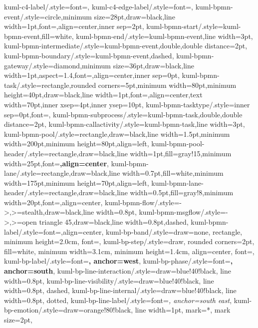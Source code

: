 {    kuml-c4-label/.style={font=\sffamily},
    kuml-c4-edge-label/.style={font=\sffamily\small},
    kuml-bpmn-event/.style={circle,minimum size=28pt,draw=black,line width=1pt,font=\footnotesize,align=center,inner sep=2pt},
    kuml-bpmn-start/.style={kuml-bpmn-event,fill=white},
    kuml-bpmn-end/.style={kuml-bpmn-event,line width=3pt},
    kuml-bpmn-intermediate/.style={kuml-bpmn-event,double,double distance=2pt},
    kuml-bpmn-boundary/.style={kuml-bpmn-event,dashed},
    kuml-bpmn-gateway/.style={diamond,minimum size=36pt,draw=black,line width=1pt,aspect=1.4,font=\footnotesize,align=center,inner sep=0pt},
    kuml-bpmn-task/.style={rectangle,rounded corners=5pt,minimum width=80pt,minimum height=40pt,draw=black,line width=1pt,font=\footnotesize,align=center,text width=70pt,inner xsep=4pt,inner ysep=10pt},
    kuml-bpmn-tasktype/.style={inner sep=0pt,font=\sffamily\bfseries\fontsize{6}{6}\selectfont},
    kuml-bpmn-subprocess/.style={kuml-bpmn-task,double,double distance=2pt},
    kuml-bpmn-callactivity/.style={kuml-bpmn-task,line width=3pt},
    kuml-bpmn-pool/.style={rectangle,draw=black,line width=1.5pt,minimum width=200pt,minimum height=80pt,align=left},
    kuml-bpmn-pool-header/.style={rectangle,draw=black,line width=1pt,fill=gray!15,minimum width=25pt,font=\footnotesize\bfseries,align=center},
    kuml-bpmn-lane/.style={rectangle,draw=black,line width=0.7pt,fill=white,minimum width=175pt,minimum height=70pt,align=left},
    kuml-bpmn-lane-header/.style={rectangle,draw=black,line width=0.5pt,fill=gray!8,minimum width=20pt,font=\scriptsize,align=center},
    kuml-bpmn-flow/.style={->,>=stealth,draw=black,line width=0.8pt},
    kuml-bpmn-msgflow/.style={->,>=open triangle 45,draw=black,line width=0.8pt,dashed},
    kuml-bpmn-label/.style={font=\scriptsize,align=center},
    kuml-bp-band/.style={draw=none, rectangle, minimum height=2.0cm, font=\sffamily},
    kuml-bp-step/.style={draw, rounded corners=2pt, fill=white, minimum width=3.1cm, minimum height=1.4cm, align=center, font=\sffamily\small},
    kuml-bp-label/.style={font=\sffamily\bfseries, anchor=west},
    kuml-bp-phase/.style={font=\sffamily\bfseries, anchor=south},
    kuml-bp-line-interaction/.style={draw=blue!40!black, line width=0.8pt},
    kuml-bp-line-visibility/.style={draw=blue!40!black, line width=0.8pt, dashed},
    kuml-bp-line-internal/.style={draw=blue!40!black, line width=0.8pt, dotted},
    kuml-bp-line-label/.style={font=\sffamily\itshape\footnotesize, anchor=south east},
    kuml-bp-emotion/.style={draw=orange!80!black, line width=1pt, mark=*, mark size=2pt},
  }
